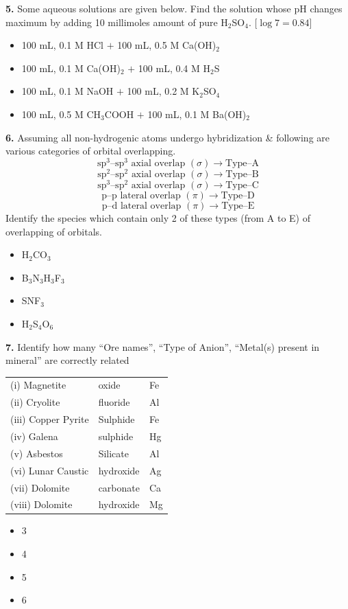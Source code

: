 \documentclass[10pt,twocolumn]{extarticle}
\renewcommand{\arraystretch}{1.15}
\newenvironment{qoptions}{\begin{itemize}[leftmargin=1.8em,itemsep=2pt,topsep=2pt,label={}]}{\end{itemize}}
\newcommand{\opt}[2]{\item[({#1})] {#2}}
\begin{document}
\textbf{5.} Some aqueous solutions are given below. Find the solution whose pH changes maximum by adding 10 millimoles amount of pure H$_2$SO$_4$. [$\log7=0.84$]

\begin{qoptions}
\opt{A}{100 mL, 0.1 M HCl $+$ 100 mL, 0.5 M Ca(OH)$_2$}
\opt{B}{100 mL, 0.1 M Ca(OH)$_2$ $+$ 100 mL, 0.4 M H$_2$S}
\opt{C}{100 mL, 0.1 M NaOH $+$ 100 mL, 0.2 M K$_2$SO$_4$}
\opt{D}{100 mL, 0.5 M CH$_3$COOH $+$ 100 mL, 0.1 M Ba(OH)$_2$}
\end{qoptions}

\textbf{6.} Assuming all non-hydrogenic atoms undergo hybridization \& following are various categories of orbital overlapping.
\[\text{sp}^3\text{--sp}^3 \text{ axial overlap } (\sigma) \longrightarrow \text{Type--A}\]
\[\text{sp}^2\text{--sp}^2 \text{ axial overlap } (\sigma) \longrightarrow \text{Type--B}\]
\[\text{sp}^3\text{--sp}^2 \text{ axial overlap } (\sigma) \longrightarrow \text{Type--C}\]
\[\text{p--p lateral overlap } (\pi) \longrightarrow \text{Type--D}\]
\[\text{p--d lateral overlap } (\pi) \longrightarrow \text{Type--E}\]
Identify the species which contain only 2 of these types (from A to E) of overlapping of orbitals.

\begin{qoptions}
\opt{A}{H$_2$CO$_3$}
\opt{B}{B$_3$N$_3$H$_3$F$_3$}
\opt{C}{SNF$_3$}
\opt{D}{H$_2$S$_4$O$_6$}
\end{qoptions}

\textbf{7.} Identify how many ``Ore names'', ``Type of Anion'', ``Metal(s) present in mineral'' are correctly related
\begin{center}
\renewcommand{\arraystretch}{1.15}
\begin{tabular}{@{}lll@{}}
(i) Magnetite & oxide & Fe\\
(ii) Cryolite & fluoride & Al\\
(iii) Copper Pyrite & Sulphide & Fe\\
(iv) Galena & sulphide & Hg\\
(v) Asbestos & Silicate & Al\\
(vi) Lunar Caustic & hydroxide & Ag\\
(vii) Dolomite & carbonate & Ca\\
(viii) Dolomite & hydroxide & Mg\\
\end{tabular}
\end{center}

\begin{qoptions}
\opt{A}{3}
\opt{B}{4}
\opt{C}{5}
\opt{D}{6}
\end{qoptions}
\end{document}
